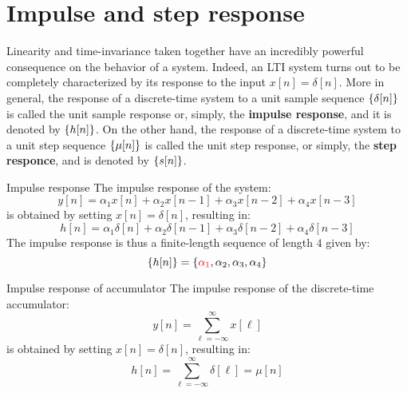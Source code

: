 \documentclass[../../main/main.tex]{subfiles}
\begin{document}

\section{Impulse and step response}
Linearity and time-invariance taken together have an incredibly powerful consequence on the behavior of a system. Indeed, an LTI system turns out to be completely characterized by its response to the input \( x[n] = \delta[n] \).
More in general, the response of a discrete-time system to a unit sample sequence \( \qty{\delta[n]} \) is called the unit sample response or, simply, the \textbf{impulse response}, and it is denoted by \( \qty{h[n]} \).
On the other hand, the response of a discrete-time system to a unit step sequence \( \qty{\mu[n]} \) is called the unit step response, or simply, the \textbf{step responce}, and is denoted by \( \qty{s[n]} \).

\begin{example}{Impulse response}{}
    The impulse response of the system:
    \begin{equation}
        y[n]
        =
        \alpha_{1}x[n] + \alpha_{2}x[n-1] + \alpha_{3}x[n-2] + \alpha_{4}x[n-3]
        \label{eq:L05_S04_1}
    \end{equation}
    is obtained by setting \( x[n] = \delta[n] \), resulting in:
    \begin{equation}
        h[n]
        =
        \alpha_{1}\delta[n] + \alpha_{2}\delta[n-1] + \alpha_{3}\delta[n-2] + \alpha_{4}\delta[n-3]
        \label{eq:L05_S04_2}
    \end{equation}
    The impulse response is thus a finite-length sequence of length \( 4 \) given by:
    \begin{equation}
        \qty{h[n]}
        =
        \qty{{\color{red}\alpha_{1}}, \alpha_{2}, \alpha_{3}, \alpha_{4}}
        \label{eq:L05_S04_3}
    \end{equation}
\end{example}

\begin{example}{Impulse response of accumulator}{}
    The impulse response of the discrete-time accumulator:
    \begin{equation}
        y[n]
        =
        \sum_{\ell = -\infty}^{\infty} x[\ell]
        \label{eq:L05_S05_1}
    \end{equation}
    is obtained by setting \( x[n] = \delta[n] \), resulting in:
    \begin{equation}
        h[n]
        =
        \sum_{\ell = -\infty}^{\infty} \delta[\ell]
        =
        \mu[n]
        \label{eq:L05_S05_2}
    \end{equation}
\end{example}
\end{document}
